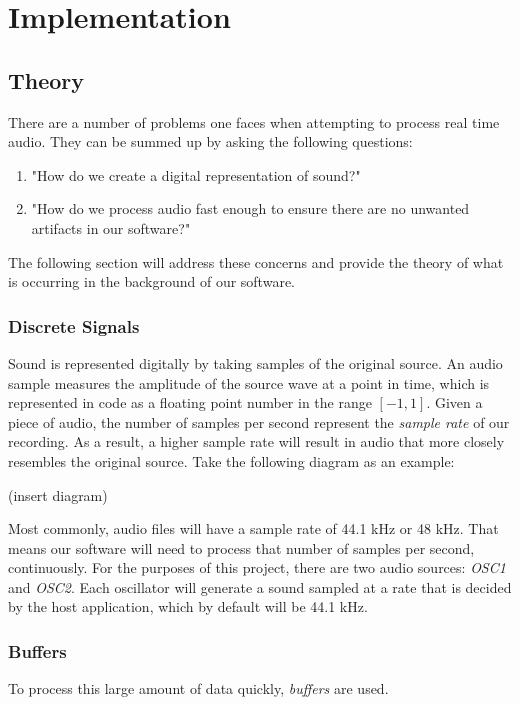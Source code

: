 \documentclass[12pt]{article}
\begin{document}
\section{Implementation}

\subsection{Theory}
There are a number of problems one faces when attempting to process real time audio. They can be summed up by asking the following questions:

\begin{enumerate}
	\item "How do we create a digital representation of sound?"
	\item "How do we process audio fast enough to ensure there are no unwanted artifacts in our software?"
\end{enumerate}

The following section will address these concerns and provide the theory of what is occurring in the background of our software.

\subsubsection{Discrete Signals}
Sound is represented digitally by taking samples of the original source. An audio sample measures the amplitude of the source wave at a point in time, which is represented in code as a floating point number in the range \([-1, 1]\). Given a piece of audio, the number of samples per second represent the \textit{sample rate} of our recording. As a result, a higher sample rate will result in audio that more closely resembles the original source. Take the following diagram as an example:

(insert diagram)

Most commonly, audio files will have a sample rate of 44.1 kHz or 48 kHz. That means our software will need to process that number of samples per second, continuously. For the purposes of this project, there are two audio sources: \textit{OSC1} and \textit{OSC2}. Each oscillator will generate a sound sampled at a rate that is decided by the host application, which by default will be 44.1 kHz.

\subsubsection{Buffers}
To process this large amount of data quickly, \textit{buffers} are used.
\end{document}
